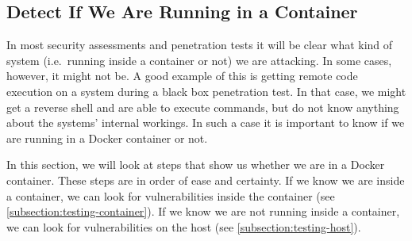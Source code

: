 \subsection{Detect If We Are Running in a Container}\label{subsection:detection}
In most security assessments and penetration tests it will be clear what kind of system (i.e.\ running inside a container or not) we are attacking. In some cases, however, it might not be. A good example of this is getting remote code execution on a system during a black box penetration test. In that case, we might get a reverse shell and are able to execute commands, but do not know anything about the systems' internal workings. In such a case it is important to know if we are running in a Docker container or not.

\medskip

In this section, we will look at steps that show us whether we are in a Docker container. These steps are in order of ease and certainty. If we know we are inside a container, we can look for vulnerabilities inside the container (see \autoref{subsection:testing-container}). If we know we are not running inside a container, we can look for vulnerabilities on the host (see \autoref{subsection:testing-host}).





